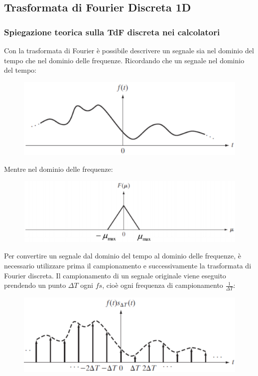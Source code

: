 \documentclass[a4paper]{article}
\begin{document}
	\subsection{Trasformata di Fourier Discreta 1D}\label{trasformata di Fourier Discreta 1D}
	
	\subsubsection{Spiegazione teorica sulla TdF discreta nei calcolatori}
	
	Con la trasformata di Fourier è possibile descrivere un segnale sia nel dominio del tempo che nel dominio delle frequenze. Ricordando che un segnale nel dominio del tempo:
	\begin{figure}[!htp]
		\centering
		\includegraphics[width=\textwidth]{img/lab/dominio_del_tempo.png}
	\end{figure}
	
	\noindent
	Mentre nel dominio delle frequenze:
	\begin{figure}[!htp]
		\centering
		\includegraphics[width=\textwidth]{img/lab/dominio_delle_frequenze.png}
	\end{figure}
	
	\noindent
	Per convertire un segnale dal dominio del tempo al dominio delle frequenze, è necessario utilizzare prima il campionamento e successivamente la trasformata di Fourier discreta. Il campionamento di un segnale originale viene eseguito prendendo un punto $\Delta T$ ogni $fs$, cioè ogni frequenza di campionamento $\frac{1}{\Delta T}$:
	\begin{figure}[!htp]
		\centering
		\includegraphics[width=\textwidth]{img/lab/campionamento.png}
	\end{figure}\newpage
	
\end{document}
